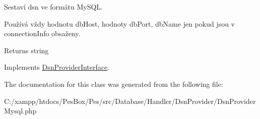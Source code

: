 Sestaví dsn ve formátu My\+S\+QL.

Používá vždy hodnotu db\+Host, hodnoty db\+Port, db\+Name jen pokud jsou v connection\+Info obsaženy.

\begin{DoxyReturn}{Returns}
string 
\end{DoxyReturn}


Implements \mbox{\hyperlink{interface_pes_1_1_database_1_1_handler_1_1_dsn_provider_1_1_dsn_provider_interface_a7252e2f23ea50a5061fef81d06d6765a}{Dsn\+Provider\+Interface}}.



The documentation for this class was generated from the following file\+:\begin{DoxyCompactItemize}
\item 
C\+:/xampp/htdocs/\+Pes\+Box/\+Pes/src/\+Database/\+Handler/\+Dsn\+Provider/Dsn\+Provider\+Mysql.\+php\end{DoxyCompactItemize}
